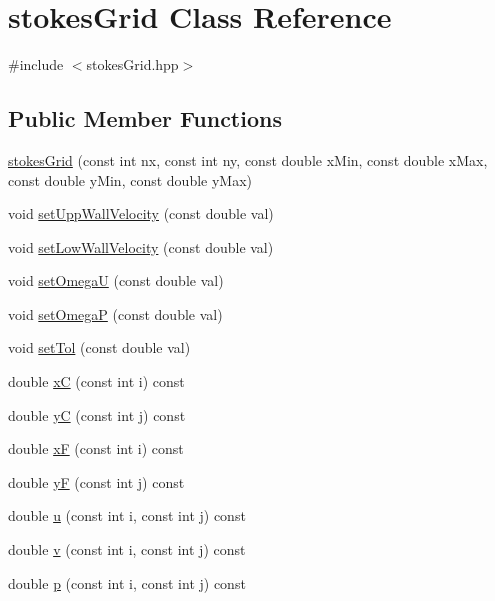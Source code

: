 \hypertarget{classstokesGrid}{}\section{stokes\+Grid Class Reference}
\label{classstokesGrid}


{\ttfamily \#include $<$stokes\+Grid.\+hpp$>$}

\subsection*{Public Member Functions}
\begin{DoxyCompactItemize}
\item 
\hyperlink{classstokesGrid_a9c6ba1544914f9b796e308982c6850b6}{stokes\+Grid} (const int nx, const int ny, const double x\+Min, const double x\+Max, const double y\+Min, const double y\+Max)
\item 
void \hyperlink{classstokesGrid_ae2822f6f932eb55c68b9e1b6ad928d14}{set\+Upp\+Wall\+Velocity} (const double val)
\item 
void \hyperlink{classstokesGrid_a50893f188b7614e0833405ba913584bf}{set\+Low\+Wall\+Velocity} (const double val)
\item 
void \hyperlink{classstokesGrid_a5aee236f67595380ae097a388c7fd90f}{set\+OmegaU} (const double val)
\item 
void \hyperlink{classstokesGrid_af7696163e6000dec6d0a94db68a81aad}{set\+OmegaP} (const double val)
\item 
void \hyperlink{classstokesGrid_a659370bf6d4e8842bd2ad65044e08446}{set\+Tol} (const double val)
\item 
double \hyperlink{classstokesGrid_a7d0a12c2c2b992e277e5c647e9c043c4}{xC} (const int i) const
\item 
double \hyperlink{classstokesGrid_af4abd0b7372a6fad8b14ce8770a8e31a}{yC} (const int j) const
\item 
double \hyperlink{classstokesGrid_ad913a3af47df559178ed3cd040c6522e}{xF} (const int i) const
\item 
double \hyperlink{classstokesGrid_a101e786b6f6bc39c909ff0bc36d2f62e}{yF} (const int j) const
\item 
double \hyperlink{classstokesGrid_ac25f2161d1c4faf8065e77e8600d513c}{u} (const int i, const int j) const
\item 
double \hyperlink{classstokesGrid_a7b5a05d7b0ec1771ec3db490a73700f5}{v} (const int i, const int j) const
\item 
double \hyperlink{classstokesGrid_a3a88f709045b484f5a058d652890ca93}{p} (const int i, const int j) const

\end{DoxyCompactItemize}
